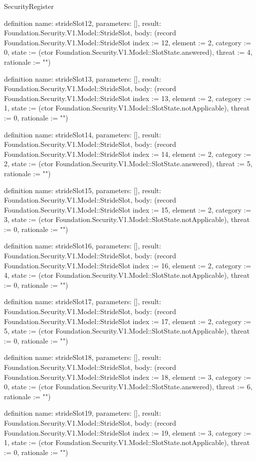 \begin{lexlean}{SecurityRegister}
\begin{semanticmodule}
definition{
  name: strideSlot12,
  parameters: [],
  result: Foundation.Security.V1.Model::StrideSlot,
  body: (record Foundation.Security.V1.Model::StrideSlot {index := 12, element := 2, category := 0, state := (ctor Foundation.Security.V1.Model::SlotState.answered), threat := 4, rationale := ""})
}

definition{
  name: strideSlot13,
  parameters: [],
  result: Foundation.Security.V1.Model::StrideSlot,
  body: (record Foundation.Security.V1.Model::StrideSlot {index := 13, element := 2, category := 1, state := (ctor Foundation.Security.V1.Model::SlotState.notApplicable), threat := 0, rationale := ""})
}

definition{
  name: strideSlot14,
  parameters: [],
  result: Foundation.Security.V1.Model::StrideSlot,
  body: (record Foundation.Security.V1.Model::StrideSlot {index := 14, element := 2, category := 2, state := (ctor Foundation.Security.V1.Model::SlotState.answered), threat := 5, rationale := ""})
}

definition{
  name: strideSlot15,
  parameters: [],
  result: Foundation.Security.V1.Model::StrideSlot,
  body: (record Foundation.Security.V1.Model::StrideSlot {index := 15, element := 2, category := 3, state := (ctor Foundation.Security.V1.Model::SlotState.notApplicable), threat := 0, rationale := ""})
}

definition{
  name: strideSlot16,
  parameters: [],
  result: Foundation.Security.V1.Model::StrideSlot,
  body: (record Foundation.Security.V1.Model::StrideSlot {index := 16, element := 2, category := 4, state := (ctor Foundation.Security.V1.Model::SlotState.notApplicable), threat := 0, rationale := ""})
}

definition{
  name: strideSlot17,
  parameters: [],
  result: Foundation.Security.V1.Model::StrideSlot,
  body: (record Foundation.Security.V1.Model::StrideSlot {index := 17, element := 2, category := 5, state := (ctor Foundation.Security.V1.Model::SlotState.notApplicable), threat := 0, rationale := ""})
}

definition{
  name: strideSlot18,
  parameters: [],
  result: Foundation.Security.V1.Model::StrideSlot,
  body: (record Foundation.Security.V1.Model::StrideSlot {index := 18, element := 3, category := 0, state := (ctor Foundation.Security.V1.Model::SlotState.answered), threat := 6, rationale := ""})
}

definition{
  name: strideSlot19,
  parameters: [],
  result: Foundation.Security.V1.Model::StrideSlot,
  body: (record Foundation.Security.V1.Model::StrideSlot {index := 19, element := 3, category := 1, state := (ctor Foundation.Security.V1.Model::SlotState.notApplicable), threat := 0, rationale := ""})
}


\end{semanticmodule}
\end{lexlean}
